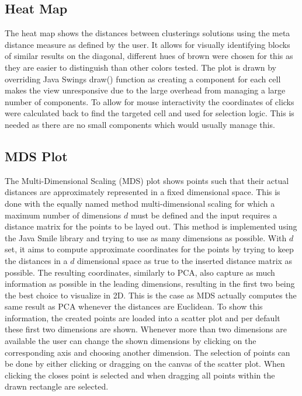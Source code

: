 \documentclass[
	a4paper,
	english,
	twoside,
	openright,               
	11pt                            
	]{report}
\begin{document}
\subsection{Heat Map}
The heat map shows the distances between clusterings solutions using the meta distance measure as defined by the user. It allows for visually identifying blocks of similar results on the diagonal, different hues of brown were chosen for this as they are easier to distinguish than other colors tested. The plot is drawn by overriding Java Swings \cite{javaswing} draw() function as creating a component for each cell makes the view unresponsive due to the large overhead from managing a large number of components. To allow for mouse interactivity the coordinates of clicks were calculated back to find the targeted cell and used for selection logic. This is needed as there are no small components which would usually manage this.

\subsection{MDS Plot}
The Multi-Dimensional Scaling (MDS) plot shows points such that their actual distances are approximately represented in a fixed dimensional space. This is done with the equally named method multi-dimensional scaling \cite{mds} for which a maximum number of dimensions $d$ must be defined and the input requires a distance matrix for the points to be layed out. This method is implemented using the Java Smile \cite{javasmile} library and trying to use as many dimensions as possible. With $d$ set, it aims to compute approximate coordinates for the points by trying to keep the distances in a $d$ dimensional space as true to the inserted distance matrix as possible. The resulting coordinates, similarly to PCA, also capture as much information as possible in the leading dimensions, resulting in the first two being the best choice to visualize in 2D. This is the case as MDS actually computes the same result as PCA whenever the distances are Euclidean. To show this information, the created points are loaded into a scatter plot and per default these first two dimensions are shown. Whenever more than two dimensions are available the user can change the shown dimensions by clicking on the corresponding axis and choosing another dimension. The selection of points can be done by either clicking or dragging on the canvas of the scatter plot. When clicking the closes point is selected and when dragging all points within the drawn rectangle are selected.
\end{document}
